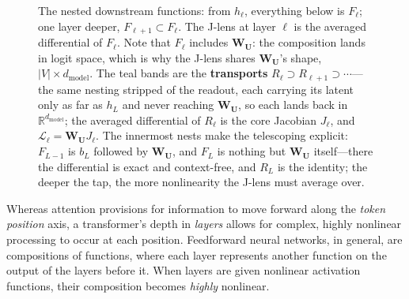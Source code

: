 \documentclass{article}
\newcommand{\jlens}{\mathscr{L}}
\newcommand{\dmodel}{d_{\text{model}}}
\begin{document}
\begin{figure}[htbp]
{}
\caption{The nested downstream functions: from $h_\ell$, everything below is $F_\ell$; one layer deeper, $F_{\ell+1}\subset F_\ell$. The J-lens at layer $\ell$ is the averaged differential of $F_\ell$. Note that $F_\ell$ includes $\mathbf{W_U}$: the composition lands in logit space, which is why the J-lens shares $\mathbf{W_U}$'s shape, $|V| \times \dmodel$. The teal bands are the \textbf{transports} $R_\ell \supset R_{\ell+1} \supset \cdots$---the same nesting stripped of the readout, each carrying its latent only as far as $h_L$ and never reaching $\mathbf{W_U}$, so each lands back in $\mathbb{R}^{\dmodel}$; the averaged differential of $R_\ell$ is the core Jacobian $J_\ell$, and $\jlens_\ell = \mathbf{W_U} J_\ell$. The innermost nests make the telescoping explicit: $F_{L-1}$ is $b_L$ followed by $\mathbf{W_U}$, and $F_L$ is nothing but $\mathbf{W_U}$ itself---there the differential is exact and context-free, and $R_L$ is the identity; the deeper the tap, the more nonlinearity the J-lens must average over.}
\label{fig:f-nesting}
\end{figure}


Whereas attention provisions for information to move forward along the \textit{token position} axis, a transformer's depth in \textit{layers} allows for complex, highly nonlinear processing to occur at each position. Feedforward neural networks, in general, are compositions of functions, where each layer represents another function on the output of the layers before it. When layers are given nonlinear activation functions, their composition becomes \textit{highly} nonlinear. 
\end{document}
